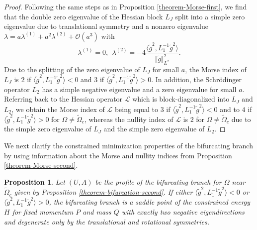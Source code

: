 \documentclass[12pt,reqno]{amsart}
\numberwithin{equation}{section}
\newtheorem{proposition}{Proposition}
\begin{document}
\begin{proof}
Following the same steps as in Proposition \ref{theorem-Morse-first}, we find that the double zero eigenvalue of the Hessian block $L_J$ split 
into a simple zero eigenvalue due to translational symmetry and a nonzero eigenvalue $\lambda = a \lambda^{(1)} + a^2 \lambda^{(2)} + \mathcal{O}(a^3)$ with 
\[\lambda^{(1)}=0, \ \ 
\lambda^{(2)}=-4\frac{\langle \tilde{g}^2,L_{1}^{-1}\tilde{g}^2\rangle}{\Vert \tilde{g}\Vert^2_{L^2}}.
\]
Due to the splitting of the zero eigenvalue of $L_J$ for small $a$, the Morse index of \(L_J\) is $2$ if \(\langle \tilde{g}^2,L_{1}^{-1}\tilde{g}^2\rangle<0\) and $3$ if \(\langle \tilde{g}^2,L_{1}^{-1}\tilde{g}^2\rangle>0\). In addition, the Schr\"{o}dinger 
operator \(L_2\) has a simple negative eigenvalue and a zero eigenvalue for 
small $a$. Referring back to the Hessian operator \(\mathcal{L}\) which is block-diagonalized into $L_J$ and $L_2$, we obtain the Morse index of \(\mathcal{L}\) being equal to $3$ if \(\langle \tilde{g}^2,L_{1}^{-1}\tilde{g}^2\rangle<0\) and to $4$ if \(\langle \tilde{g}^2,L_{1}^{-1}\tilde{g}^2\rangle>0\) for $\Omega \neq \widetilde{\Omega}_c$, whereas the nullity index of \(\mathcal{L}\) is $2$ for $\Omega \neq \widetilde{\Omega}_c$ due to the simple zero eigenvalue of $L_J$ and 
the simple zero eigenvalue of $L_2$.
\end{proof}

We next clarify the constrained minimization properties of the bifurcating branch by using information about the Morse and nullity indices from Proposition \ref{theorem-Morse-second}.

\begin{proposition}
    \label{theorem-stability-second}
    Let $(U,A)$ be the profile of the bifurcating branch for $\Omega$ near $\widetilde{\Omega}_c$ given by Proposition \ref{theorem-bifurcation-second}. 
If either $\langle \tilde{g}^2, L_1^{-1} \tilde{g}^2 \rangle < 0$ or $\langle \tilde{g}^2, L_1^{-1} \tilde{g}^2 \rangle > 0$, the bifurcating branch 
is a saddle point of the constrained energy $H$ for fixed momentum $P$ and mass $Q$ with exactly two negative eigendirections and degenerate only by the translational and rotational symmetries. 
\end{proposition}
\end{document}
